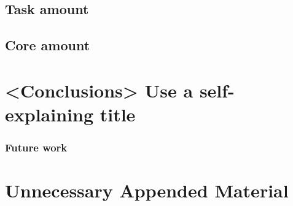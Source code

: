 \documentclass{kththesis}
\begin{document}
\section{Task amount}

\section{Core amount}

\chapter{<Conclusions> Use a self-explaining title}


\subsection{Future work}



\printbibliography[heading=bibintoc] 

\appendix

\chapter{Unnecessary Appended Material}
\end{document}
